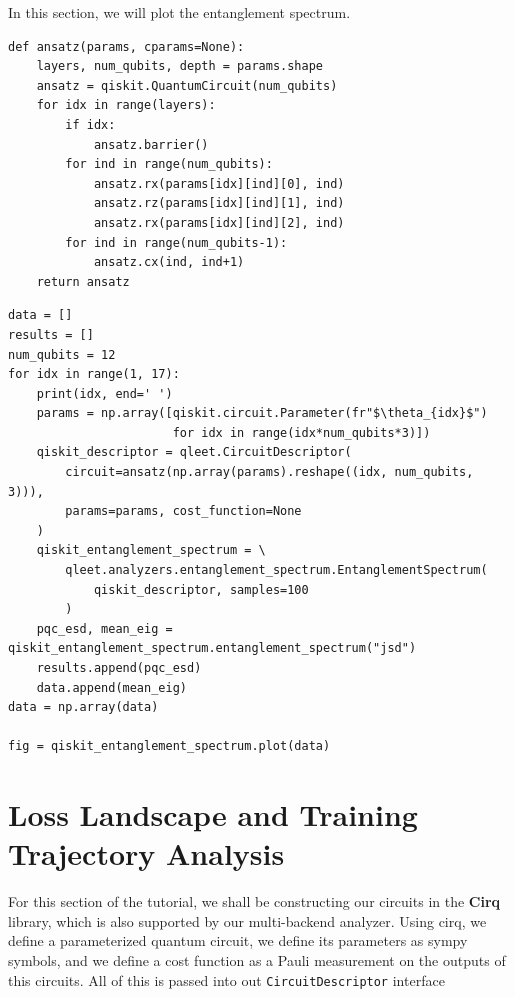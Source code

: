 \documentclass[%
 reprint,
 amsmath,
 amssymb,
 showkeys,
 pra,
 floatfix,
 onecolumn,
]{revtex4-2}
\begin{document}
In this section, we will plot the entanglement spectrum.

\begin{lstlisting}
def ansatz(params, cparams=None):
    layers, num_qubits, depth = params.shape
    ansatz = qiskit.QuantumCircuit(num_qubits)
    for idx in range(layers):
        if idx:
            ansatz.barrier()
        for ind in range(num_qubits):
            ansatz.rx(params[idx][ind][0], ind)
            ansatz.rz(params[idx][ind][1], ind)
            ansatz.rx(params[idx][ind][2], ind)
        for ind in range(num_qubits-1):
            ansatz.cx(ind, ind+1)
    return ansatz
\end{lstlisting}

\begin{lstlisting}
data = []
results = []
num_qubits = 12
for idx in range(1, 17):
    print(idx, end=' ')
    params = np.array([qiskit.circuit.Parameter(fr"$\theta_{idx}$")
                       for idx in range(idx*num_qubits*3)])
    qiskit_descriptor = qleet.CircuitDescriptor(
        circuit=ansatz(np.array(params).reshape((idx, num_qubits, 3))), 
        params=params, cost_function=None
    )
    qiskit_entanglement_spectrum = \
        qleet.analyzers.entanglement_spectrum.EntanglementSpectrum(
            qiskit_descriptor, samples=100
        )
    pqc_esd, mean_eig = qiskit_entanglement_spectrum.entanglement_spectrum("jsd")
    results.append(pqc_esd)
    data.append(mean_eig)
data = np.array(data)

fig = qiskit_entanglement_spectrum.plot(data)
\end{lstlisting}

\section{\label{sec:supl-loss-tutorial}Loss Landscape and Training Trajectory Analysis}

For this section of the tutorial, we shall be constructing our circuits in the \textbf{Cirq} library, which is also supported by our multi-backend analyzer. Using cirq, we define a parameterized quantum circuit, we define its parameters as sympy symbols, and we define a cost function as a Pauli measurement on the outputs of this circuits. All of this is passed into out \lstinline{CircuitDescriptor} interface
\end{document}

